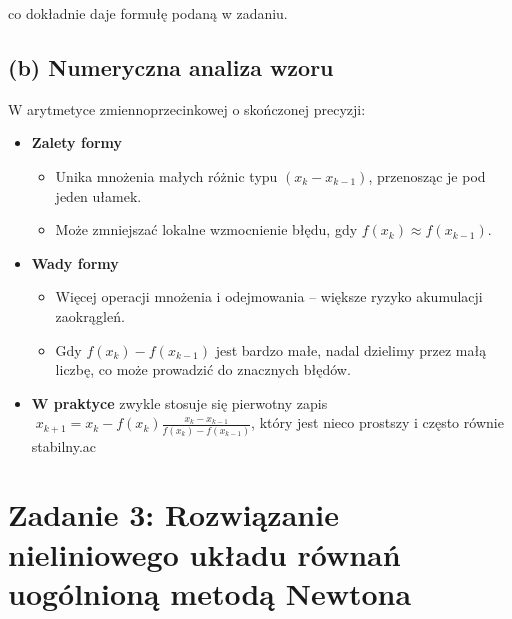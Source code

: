 \documentclass[a4paper,12pt]{article}
\begin{document}
    co dokładnie daje formułę podaną w zadaniu.
    
    \subsection*{(b) Numeryczna analiza wzoru}
    
    W arytmetyce zmiennoprzecinkowej o skończonej precyzji:
    
    \begin{itemize}
      \item \textbf{Zalety formy}
        \begin{itemize}
          \item Unika mnożenia małych różnic typu \((x_k - x_{k-1})\), przenosząc je pod jeden ułamek.
          \item Może zmniejszać lokalne wzmocnienie błędu, gdy \(f(x_k)\approx f(x_{k-1})\).
        \end{itemize}
      \item \textbf{Wady formy}
        \begin{itemize}
          \item Więcej operacji mnożenia i odejmowania – większe ryzyko akumulacji zaokrągleń.
          \item Gdy \(f(x_k)-f(x_{k-1})\) jest bardzo małe, nadal dzielimy przez małą liczbę, co może prowadzić do znacznych błędów.
        \end{itemize}
      \item \textbf{W praktyce} zwykle stosuje się pierwotny zapis
      \(\;x_{k+1}=x_k - f(x_k)\frac{x_k - x_{k-1}}{f(x_k)-f(x_{k-1})}\),
      który jest nieco prostszy i często równie stabilny.ac
    \end{itemize}
    
    \section*{Zadanie 3: Rozwiązanie nieliniowego układu równań uogólnioną metodą Newtona}
    
\end{document}
